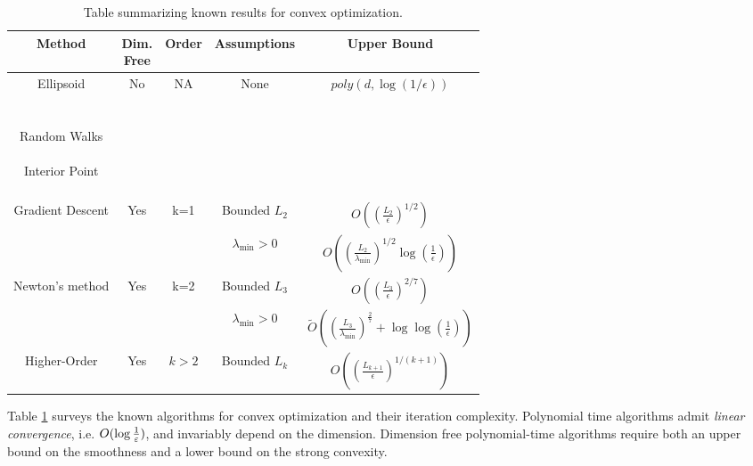 \documentclass[final,12pt]{colt2018} %
\begin{document}
\begin{table}[h]

\label{table:main}
\begin{center}
\begin{tabular}{ |c|c|c|c|c|} 
 
 \hline
 \textbf{Method} & \thead{\textbf{Dim.} \\ \textbf{Free}} & \textbf{Order} & \textbf{Assumptions} & \textbf{Upper Bound}\\
 \hline   %
 \makecell{Ellipsoid \\ \citep{grotschel2012geometric} \\ \citep{vaidya1989new} \\ Random Walks \\ \citep{kalai2006simulated}  \\ Interior Point \\ \citep{nesterov1994interior}\\\citep{abernethy2015faster} }  & No & NA & None & $poly\left(d, \log(1/\epsilon)\right)$\\
 \hline
  \multirow{2}{*}{Gradient Descent} & \multirow{2}{*}{Yes} & \multirow{2}{*}{k=1} & Bounded $L_2$ & $O\left(\left(\frac{L_2}{\epsilon}\right)^{1/2}\right)$ \\
\hhline{~~~--} \citep{NesterovBook} & & & $\lambda_{\min} > 0$  & $O\left(\left(\frac{L_2}{\lambda_{\min}}\right)^{1/2}  \log(\frac{1}{\epsilon})\right)$  \\
\hline
\multirow{2}{*}{Newton's method } & \multirow{2}{*}{Yes} & \multirow{2}{*}{k=2} & Bounded $L_3$ & $O\left(\left(\frac{L_3}{\epsilon}\right)^{2/7}\right)$ \\
\hhline{~~~--} \citep{monteiro2013accelerated} & & & $\lambda_{\min} > 0$  & $\tilde{O}\left(\left(\frac{L_3}{\lambda_{\min}}\right)^{\frac{2}{7}}+ \log\log(\frac{1}{\epsilon})\right)$  \\ 
 \hline
 \makecell{Higher-Order \\ \citep{baeshigherorder}} & Yes & $k > 2$ & Bounded $L_k$ & $O\left(\left(\frac{L_{k+1}}{\epsilon}\right)^{1/(k+1)}\right)$ \\ 
 \hline
\end{tabular}
\end{center}
\caption{Table summarizing known results for convex optimization. }
\end{table}



Table \ref{table:main} surveys the known algorithms for convex optimization and their iteration complexity.  Polynomial time algorithms admit {\it linear convergence}, i.e. $O(\log \frac{1}{\varepsilon})$, and invariably depend on the dimension. Dimension free polynomial-time algorithms require both an upper bound on the smoothness and a lower bound on the strong convexity.  
\end{document}
